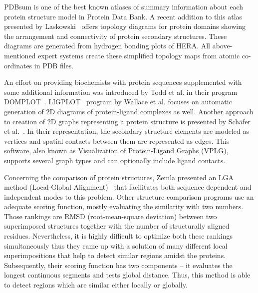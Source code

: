 \documentclass[twocolumn]{bmcart}%
\begin{document}
PDBsum is one of the best known atlases of summary information about each protein structure model in Protein Data Bank.
A recent addition to this atlas presented by Laskowski~\cite{Laskowski2009} offers topology diagrams for protein domains showing the arrangement and connectivity of protein secondary structures.
These diagrams are generated from hydrogen bonding plots of HERA.
All above-mentioned expert systems create these simplified topology maps from atomic co-ordinates in PDB files.

An effort on providing biochemists with protein sequences supplemented with some additional information was introduced by Todd et al. in their program DOMPLOT~\cite{Todd1999}.
LIGPLOT~\cite{Wallace1995} program by Wallace et al. focuses on automatic generation of 2D diagrams of protein-ligand complexes as well.
Another approach to creation of 2D graphs representing a protein structure is presented by Sch{\"a}fer et al.~\cite{Schafer2012}.
In their representation, the secondary structure elements are modeled as vertices and spatial contacts between them are represented as edges.
This software, also known as Visualization of Protein-Ligand Graphs (VPLG), supports several graph types and can optionally include ligand contacts.

Concerning the comparison of protein structures, Zemla presented an LGA method (Local-Global Alignment)~\cite{Zemla2003} that facilitates both sequence dependent and independent modes to this problem.
Other structure comparison programs use an adequate scoring function, mostly evaluating the similarity with two numbers.
Those rankings are RMSD (root-mean-square deviation) between two superimposed structures together with the number of structurally aligned residues.
Nevertheless, it is highly difficult to optimize both these rankings simultaneously thus they came up with a solution of many different local superimpositions that help to detect similar regions amidst the proteins.
Subsequently, their scoring function has two components -- it evaluates the longest continuous segments and tests global distance.
Thus, this method is able to detect regions which are similar either locally or globally.
\end{document}
